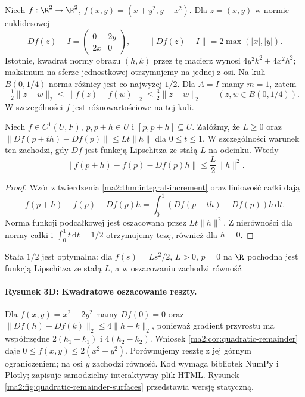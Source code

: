 \begin{przyklad}
Niech $f:\R^2\to\R^2$, $f(x,y)=(x+y^2,y+x^2)$.
Dla $z=(x,y)$ w normie euklidesowej
\[
 Df(z)-I=\begin{pmatrix}0&2y\\2x&0\end{pmatrix},
 \qquad \|Df(z)-I\|=2\max(|x|,|y|).
\]
Istotnie, kwadrat normy obrazu $(h,k)$ przez tę
macierz wynosi $4y^2k^2+4x^2h^2$; maksimum na
sferze jednostkowej otrzymujemy na jednej z osi.
Na kuli $B(0,1/4)$ norma różnicy jest co najwyżej
$1/2$. Dla $A=I$ mamy $m=1$, zatem
\[
 \tfrac12\|z-w\|_2\le\|f(z)-f(w)\|_2
 \le\tfrac32\|z-w\|_2
 \qquad(z,w\in B(0,1/4)).
\]
W szczególności $f$ jest różnowartościowe na tej kuli.
\end{przyklad}

\begin{wniosek}
\label{ma2:cor:quadratic-remainder}
Niech $f\in C^1(U,F)$, $p,p+h\in U$ i
$[p,p+h]\subseteq U$. Załóżmy, że $L\ge0$ oraz
$\|Df(p+th)-Df(p)\|\le Lt\|h\|$ dla $0\le t\le1$.
W szczególności warunek ten zachodzi, gdy $Df$ jest
funkcją Lipschitza ze stałą $L$ na odcinku. Wtedy
\[
 \|f(p+h)-f(p)-Df(p)h\|
 \le \frac L2\|h\|^2.
\]
\end{wniosek}
\begin{proof}
Wzór z twierdzenia \ref{ma2:thm:integral-increment}
oraz liniowość całki dają
\[
 f(p+h)-f(p)-Df(p)h
 =\int_0^1 (Df(p+th)-Df(p))h\,\mathrm dt.
\]
Norma funkcji podcałkowej jest oszacowana przez
$Lt\|h\|^2$. Z nierówności dla normy całki i
$\int_0^1 t\,\mathrm dt=1/2$ otrzymujemy tezę,
również dla $h=0$.
\end{proof}
Stała $1/2$ jest optymalna: dla $f(s)=Ls^2/2$,
$L>0$, $p=0$ na $\R$ pochodna jest funkcją Lipschitza
ze stałą $L$, a w oszacowaniu zachodzi równość.

\paragraph{Rysunek 3D: Kwadratowe oszacowanie reszty.}
Dla $f(x,y)=x^2+2y^2$ mamy $Df(0)=0$ oraz
$\|Df(h)-Df(k)\|_2\le4\|h-k\|_2$, ponieważ
gradient przyrostu ma współrzędne $2(h_1-k_1)$
i $4(h_2-k_2)$. Wniosek \ref{ma2:cor:quadratic-remainder}
daje $0\le f(x,y)\le2(x^2+y^2)$. Porównujemy resztę
z jej górnym ograniczeniem; na osi $y$ zachodzi równość.
Kod wymaga bibliotek NumPy i Plotly; zapisuje samodzielny
interaktywny plik HTML.
Rysunek \ref{ma2:fig:quadratic-remainder-surfaces} przedstawia wersję statyczną.

